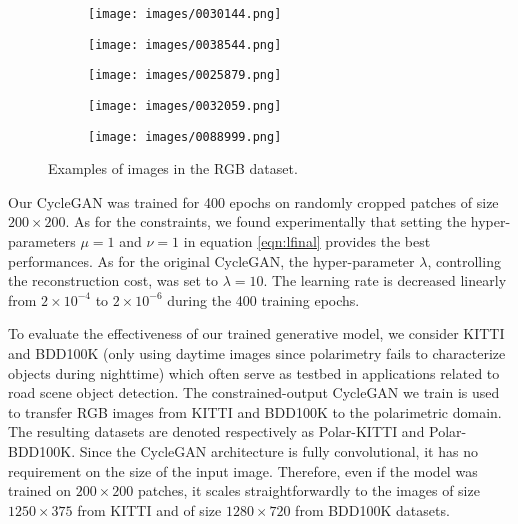 \begin{figure}
	\centering
	\begin{subfigure}{.2\textwidth}
		\centering
		\texttt{[image: images/0030144.png]}
	\end{subfigure}%
	\begin{subfigure}{.2\textwidth}
		\centering
		\texttt{[image: images/0038544.png]}
	\end{subfigure}%
	\begin{subfigure}{.2\textwidth}
		\centering
		\texttt{[image: images/0025879.png]}
	\end{subfigure}%
	\begin{subfigure}{.2\textwidth}
		\centering
		\texttt{[image: images/0032059.png]}
	\end{subfigure}%
	\begin{subfigure}{.2\textwidth}
		\centering
		\texttt{[image: images/0088999.png]}
	\end{subfigure}
	\caption{Examples of images in the RGB dataset.}
	\label{fig:rgb_example}
\end{figure}

Our CycleGAN was trained for 400 epochs on randomly cropped patches of size $200\times 200$. As for the constraints, we found experimentally that setting the hyper-parameters $\mu = 1$ and $\nu = 1$ in equation \eqref{eqn:lfinal} provides the best performances. As for the original CycleGAN, the hyper-parameter $\lambda$, controlling the reconstruction cost,
was set to $\lambda = 10$. The learning rate is decreased linearly from $2 \times 10^{-4}$ to $2 \times 10^{-6}$ during the 400 training epochs.

To evaluate the effectiveness of our trained generative model, we consider KITTI and BDD100K (only using daytime images since polarimetry fails to characterize objects during nighttime) which often serve as testbed in applications related to road scene object detection. The constrained-output CycleGAN we train is used to transfer RGB images from KITTI and BDD100K to the polarimetric domain. The resulting datasets are denoted respectively as Polar-KITTI and Polar-BDD100K. Since the CycleGAN architecture is fully convolutional, it has no requirement on the size of the input image. Therefore, even if the model was trained on $200 \times 200$ patches, it scales straightforwardly to the images of size $1250 \times 375$ from KITTI and of size $1280 \times 720$ from BDD100K datasets.

